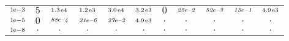 \begin{tiny}
\begin{tabular}{@{$\;$}c@{$\;$}|@{$\;$}c@{$\;$}@{$\;$}c@{$\;$}@{$\;$}c@{$\;$}@{$\;$}c@{$\;$}@{$\;$}c@{$\;$}|@{$\;$}c@{$\;$}@{$\;$}c@{$\;$}@{$\;$}c@{$\;$}@{$\;$}c@{$\;$}@{$\;$}c@{$\;$}}
$\scriptstyle1\!\mathrm{\hspace{0.10em}e}-3$ & $\scriptstyle5$ & $\scriptstyle1.3\mathrm{\hspace{0.10em}e}4$ & $\scriptstyle1.2\mathrm{\hspace{0.10em}e}3$ & $\scriptstyle3.0\mathrm{\hspace{0.10em}e}4$ & $\scriptstyle3.2\mathrm{\hspace{0.10em}e}3$ & $\scriptstyle0$ & $\scriptstyle\textit{25}\hspace{0.00em}e\textit{--2}$ & $\scriptstyle\textit{52}\hspace{0.00em}e\textit{--3}$ & $\scriptstyle\textit{15}\hspace{0.00em}e\textit{--1}$ & $\scriptstyle4.9\mathrm{\hspace{0.10em}e}3$\\ 
$\scriptstyle1\!\mathrm{\hspace{0.10em}e}-5$ & $\scriptstyle0$ & $\scriptstyle\textit{88}\hspace{0.00em}e\textit{--4}$ & $\scriptstyle\textit{21}\hspace{0.00em}e\textit{--6}$ & $\scriptstyle\textit{27}\hspace{0.00em}e\textit{--2}$ & $\scriptstyle4.9\mathrm{\hspace{0.10em}e}3$ & $\scriptstyle.$ & $\scriptstyle.$ & $\scriptstyle.$ & $\scriptstyle.$ & $\scriptstyle.$\\ 
$\scriptstyle1\!\mathrm{\hspace{0.10em}e}-8$ & $\scriptstyle.$ & $\scriptstyle.$ & $\scriptstyle.$ & $\scriptstyle.$ & $\scriptstyle.$ & $\scriptstyle.$ & $\scriptstyle.$ & $\scriptstyle.$ & $\scriptstyle.$ & $\scriptstyle.$\\ 
\end{tabular} 
\end{tiny} 
